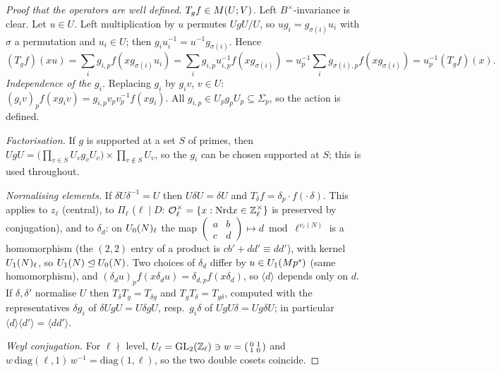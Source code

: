 \begin{proof}[Proof that the operators are well defined]
\emph{$T_gf\in M(U;V)$.} Left $B^\times$-invariance is clear. Let $u\in U$. Left multiplication by $u$ permutes
$UgU/U$, so $ug_i=g_{\sigma(i)}u_i$ with $\sigma$ a permutation and $u_i\in U$; then $g_iu_i^{-1}=u^{-1}g_{\sigma(i)}$. Hence
\[(T_gf)(xu)=\sum_ig_{i,p}f(xg_{\sigma(i)}u_i)=\sum_ig_{i,p}u_{i,p}^{-1}f(xg_{\sigma(i)})=u_p^{-1}\sum_ig_{\sigma(i),p}f(xg_{\sigma(i)})=u_p^{-1}(T_gf)(x).\]
\emph{Independence of the $g_i$.} Replacing $g_i$ by $g_iv$, $v\in U$: $(g_iv)_pf(xg_iv)=g_{i,p}v_pv_p^{-1}f(xg_i)$.
All $g_{i,p}\in U_pg_pU_p\subseteq\Sigma_p$, so the action is defined.

\emph{Factorisation.} If $g$ is supported at a set $S$ of primes, then $UgU=\big(\prod_{v\in S}U_vg_vU_v\big)\times\prod_{v\notin S}U_v$,
so the $g_i$ can be chosen supported at $S$; this is used throughout.

\emph{Normalising elements.} If $\delta U\delta^{-1}=U$ then $U\delta U=\delta U$ and $T_\delta f=\delta_p\cdot f(\cdot\,\delta)$. This
applies to $z_\ell$ (central), to $\Pi_\ell$ ($\ell\mid D$: $\mathcal{O}_\ell^\times=\{x:\mathrm{Nrd} x\in\mathbb{Z}_\ell^\times\}$ is preserved by conjugation),
and to $\delta_d$: on $U_0(N)_\ell$ the map $\left(\begin{smallmatrix}a&b\\c&d\end{smallmatrix}\right)\mapsto d\bmod\ell^{v_\ell(N)}$ is a homomorphism
(the $(2,2)$ entry of a product is $cb'+dd'\equiv dd'$), with kernel $U_1(N)_\ell$, so $U_1(N)\trianglelefteq U_0(N)$. Two
choices of $\delta_d$ differ by $u\in U_1(Mp^s)$ (same homomorphism), and $(\delta_du)_pf(x\delta_du)=\delta_{d,p}f(x\delta_d)$, so
$\langle d\rangle$ depends only on $d$. If $\delta,\delta'$ normalise $U$ then $T_\delta T_g=T_{\delta g}$ and $T_gT_\delta=T_{g\delta}$, computed with
the representatives $\delta g_i$ of $\delta UgU=U\delta gU$, resp.\ $g_i\delta$ of $UgU\delta=Ug\delta U$; in particular
$\langle d\rangle\langle d'\rangle=\langle dd'\rangle$.

\emph{Weyl conjugation.} For $\ell\nmid$ level, $U_\ell=\mathrm{GL}_2(\mathbb{Z}_\ell)\ni w=\left(\begin{smallmatrix}0&1\\1&0\end{smallmatrix}\right)$ and
$w\,\mathrm{diag}(\ell,1)\,w^{-1}=\mathrm{diag}(1,\ell)$, so the two double cosets coincide.
\end{proof}

